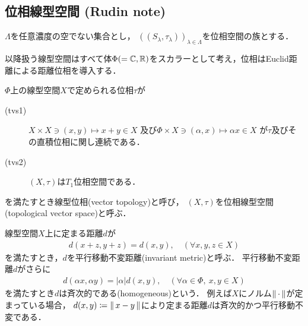 \subsection{位相線型空間 (Rudin note)}
	\begin{screen}
		\begin{thm}[多変数連続写像は一変数写像として連続]
		\label{thm:multivariable_continuous_mapping_is_one_variable_continuous}
			$\Lambda$を任意濃度の空でない集合とし，
			$\left( (S_\lambda,\tau_\lambda) \right)_{\lambda \in \Lambda}$を位相空間の族とする．
			
		\end{thm}
	\end{screen}
	
	以降扱う線型空間はすべて体$\Phi (=\mathbb{C},\mathbb{R})$をスカラーとして考え，位相はEuclid距離による距離位相を導入する．
	
	\begin{screen}
		\begin{dfn}[位相線型空間]\label{def:topological_vector_space}
			$\Phi$上の線型空間$X$で定められる位相$\tau$が
			\begin{description}
				\item[(tvs1)] $X \times X \ni (x,y) \longmapsto x+y \in X$
					及び$\Phi \times X \ni (\alpha,x) \longmapsto \alpha x \in X$
					が$\tau$及びその直積位相に関し連続である．
				\item[(tvs2)]
					$(X,\tau)$は$T_1$位相空間である．
			\end{description}
			を満たすとき線型位相(vector topology)と呼び，
			$(X,\tau)$を位相線型空間(topological vector space)と呼ぶ．
		\end{dfn}
	\end{screen}
	
	\begin{screen}
		\begin{thm}[位相線型空間は$T_3$]
		\end{thm}
	\end{screen}
	
	\begin{screen}
		\begin{dfn}[平行移動不変距離]
			線型空間$X$上に定まる距離$d$が
			\begin{align}
				d(x+z, y+z) = d(x,y),\quad (\forall x,y,z \in X)
			\end{align}
			を満たすとき，$d$を平行移動不変距離(invariant metric)と呼ぶ．
			平行移動不変距離$d$がさらに
			\begin{align}
				d(\alpha x, \alpha y) = |\alpha| d(x,y),
				\quad (\forall \alpha \in \Phi,\ x,y \in X)
			\end{align}
			を満たすとき$d$は斉次的である(homogeneous)という．
			例えば$X$にノルム$\left\|\, \cdot\, \right\|_{}$が定まっている場合，
			$d(x,y) \coloneqq \left\|\, x-y\, \right\|_{}$により定まる距離$d$は斉次的かつ平行移動不変である．
		\end{dfn}
	\end{screen}
	
